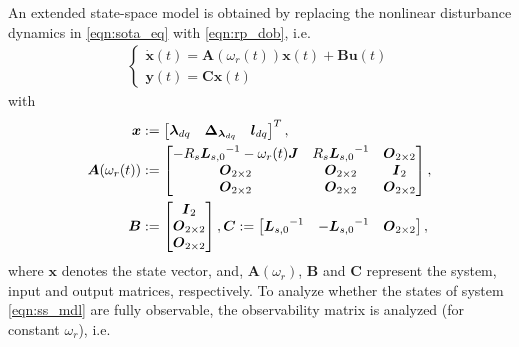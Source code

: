 \documentclass[conference]{IEEEtran}
\begin{document}
An extended state-space model is obtained by replacing the nonlinear disturbance dynamics in \eqref{eqn:sota_eq} with \eqref{eqn:rp_dob}, i.e.
\begin{align}\label{eqn:ss_mdl}
    \begin{cases}
    {{\boldsymbol{{\dot {x}}} }(t)}={{\boldsymbol{A}}({\omega}_{r}(t))} {{\boldsymbol{x}}(t)} + {{\boldsymbol{B}}{\boldsymbol{u}}(t)}\\
    {\boldsymbol{y}(t)} = {{\boldsymbol{C}}} {{\boldsymbol{x}(t)}}
    \end{cases}
    \end{align}
with 
     \begin{align}\notag
        {\boldsymbol{x}} &:= \begin{bmatrix}
        {\boldsymbol{\lambda}_{dq}}  & \boldsymbol{\Delta}_{\boldsymbol{\lambda}_{dq}} & \boldsymbol{l}_{dq}
        \end{bmatrix}^T, \\\notag
        {{\boldsymbol{A}}({\omega}_{r}(t))} &:= \begin{bmatrix}
        - {{{R}}_{s}} {\boldsymbol{L}_{s,0}}^{-1} - \omega_{r}(t)\boldsymbol{J} & {{{R}}_{s}} {\boldsymbol{L}_{s,0}}^{-1}  & {\boldsymbol{O}}_{2\times2} \\ 
        {\boldsymbol{O}}_{2\times2} & {\boldsymbol{O}}_{2\times2} & {\boldsymbol{I}}_{2} \\
        {\boldsymbol{O}}_{2\times2} & {\boldsymbol{O}}_{2\times2} & {\boldsymbol{O}}_{2\times2}
        \end{bmatrix},
        \\\notag
        {\boldsymbol{B}} &:= \begin{bmatrix}
        {\boldsymbol{I}}_{2} \\ 
        {\boldsymbol{O}}_{2\times2} \\
        {\boldsymbol{O}}_{2\times2} 
        \end{bmatrix},        
        {\boldsymbol{C}} := \begin{bmatrix}
        {\boldsymbol{L}_{s,0}}^{-1} & -{\boldsymbol{L}_{s,0}}^{-1} & {\boldsymbol{O}}_{2\times2}
        \end{bmatrix},
    \end{align} 
where ${\boldsymbol{x}}$ denotes the state vector, and, ${{\boldsymbol{A}}({\omega}_{r})}$, ${\boldsymbol{B}}$ and ${\boldsymbol{C}}$ represent the system, input and output matrices, respectively.
To analyze whether the states of system \eqref{eqn:ss_mdl} are fully observable, the observability matrix is analyzed (for constant $\omega_r$), i.e.
\end{document}
